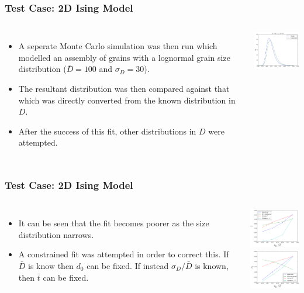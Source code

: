 \documentclass{beamer}
\begin{document}
\begin{frame}
	\frametitle{Test Case: 2D Ising Model}
	\begin{columns}
	\column{7cm}
		\begin{itemize}
		\item{A seperate Monte Carlo simulation was then run which modelled an assembly of grains with a lognormal grain size distribution ($\bar{D}=100$ and $\sigma_D=30$).}
		\item{The resultant distribution was then compared against that which was directly converted from the known distribution in $D$.}
		\item{After the success of this fit, other distributions in $D$ were attempted.}
		\end{itemize}
	\column{5cm}
		\includegraphics[width=5cm]{Images/t_dist}
	\end{columns}
\end{frame}

\begin{frame}
	\frametitle{Test Case: 2D Ising Model}
	\begin{columns}
	\column{7cm}
		\begin{itemize}
		\item{It can be seen that the fit becomes poorer as the size distribution narrows.}
		\item{A constrained fit was attempted in order to correct this. If $\bar{D}$ is know then $d_0$ can be fixed. If instead $\sigma_D/\bar{D}$ is known, then $\bar{t}$ can be fixed.}
		\end{itemize}
	\column{5cm}
		\includegraphics[width=5cm]{Images/t_bars} \\
		\includegraphics[width=5cm]{Images/sig_ts}

	\end{columns}
\end{frame}
\end{document}
